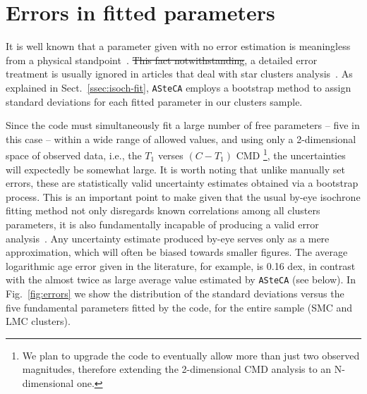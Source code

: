 \documentclass[draft]{aa}
\providecommand{\DIFaddtex}[1]{{\protect\color{blue}\uwave{#1}}} %
\providecommand{\DIFdeltex}[1]{{\protect\color{red}\sout{#1}}}                      %
\providecommand{\DIFaddbegin}{} %
\providecommand{\DIFaddend}{} %
\providecommand{\DIFdelbegin}{} %
\providecommand{\DIFdelend}{} %
\providecommand{\DIFadd}[1]{\texorpdfstring{\DIFaddtex{#1}}{#1}} %
\providecommand{\DIFdel}[1]{\texorpdfstring{\DIFdeltex{#1}}{}} %
\begin{document}

\section{Errors in fitted parameters}
\label{sec:errors-fit}

It is well known that a parameter given with no error estimation is
meaningless from a physical standpoint~\citep{Dolphin_2002,Andrae_2010}.
%
\DIFdelbegin \DIFdel{This fact notwithstanding}\DIFdelend \DIFaddbegin \DIFadd{Despite this}\DIFaddend ,
a detailed error treatment is usually ignored in
articles that deal with star clusters analysis~\citep{Paunzen_2006}.
As explained in Sect.~\ref{ssec:isoch-fit}, \texttt{ASteCA} employs a bootstrap
method to assign standard deviations for each fitted parameter in our clusters
sample.

Since the code must simultaneously fit a large number of free parameters --
five in this case -- within a wide range of allowed values, and using only a
2-dimensional space of observed data, i.e., the $T_1$ verses $(C-T_1)$ CMD
\footnote{We plan to upgrade the code to eventually allow
more than just two observed magnitudes, therefore extending the 2-dimensional
CMD analysis to an N-dimensional one.}, the uncertainties will expectedly be
somewhat large.
%
It is worth noting that unlike manually set errors, these are
statistically valid uncertainty estimates obtained via a bootstrap process.
This is an important point to make given that the usual by-eye isochrone fitting
method not only disregards known correlations among all clusters parameters,
it is also fundamentally incapable of producing a valid error
analysis~\citep{Naylor_2006}. Any uncertainty estimate produced by-eye serves
only as a mere approximation, which will often be biased towards smaller
figures. The average logarithmic age error given in the literature, for example,
is 0.16 dex, in contrast with the almost twice as large average value estimated
by \texttt{ASteCA} (see below).
%
In Fig.~\ref{fig:errors} we show the distribution of the standard deviations
versus the five fundamental parameters fitted by the code, for the entire sample
(SMC and LMC clusters).
\end{document}
